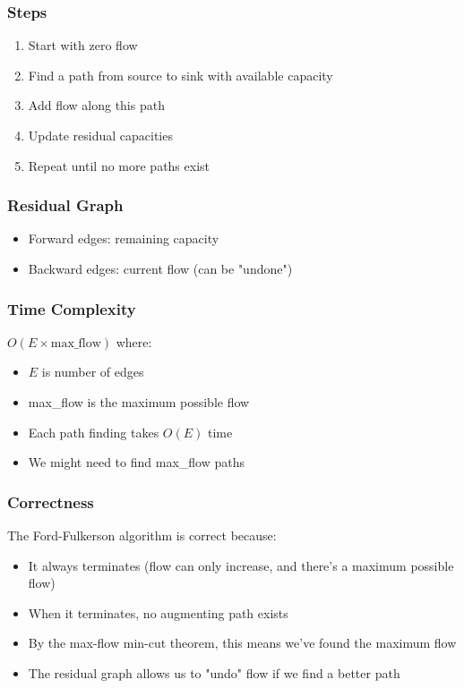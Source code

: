 \documentclass[11pt,a4paper]{article}
\begin{document}
\begin{multicols}{2}
\subsubsection{Steps}
\begin{enumerate}
    \item Start with zero flow
    \item Find a path from source to sink with available capacity
    \item Add flow along this path
    \item Update residual capacities
    \item Repeat until no more paths exist
\end{enumerate}

\subsubsection{Residual Graph}
\begin{itemize}
    \item Forward edges: remaining capacity
    \item Backward edges: current flow (can be "undone")
\end{itemize}

\subsubsection{Time Complexity}
$O(E \times \text{max\_flow})$ where:
\begin{itemize}
    \item $E$ is number of edges
    \item max\_flow is the maximum possible flow
    \item Each path finding takes $O(E)$ time
    \item We might need to find max\_flow paths
\end{itemize}

\subsubsection{Correctness}
The Ford-Fulkerson algorithm is correct because:
\begin{itemize}
    \item It always terminates (flow can only increase, and there's a maximum possible flow)
    \item When it terminates, no augmenting path exists
    \item By the max-flow min-cut theorem, this means we've found the maximum flow
    \item The residual graph allows us to "undo" flow if we find a better path
\end{itemize}


\end{multicols}
\end{document}
